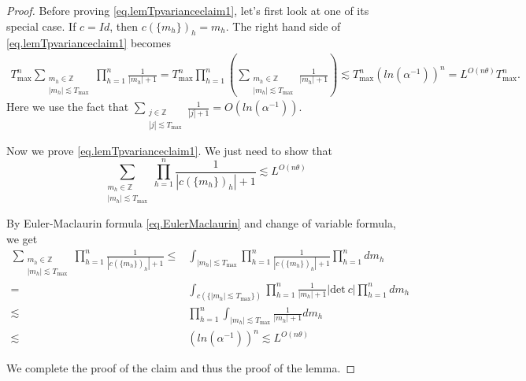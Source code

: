 \begin{proof}
Before proving \eqref{eq.lemTpvarianceclaim1}, let's first look at one of its special case. If $c=Id$, then $c(\{m_{h}\})_{h}=m_h$. The right hand side of \eqref{eq.lemTpvarianceclaim1} becomes
\begin{equation}
\begin{split}
    T^{n}_{\text{max}}\sum_{\substack{m_{h}\in \mathbb{Z}\\ |m_{h}|\lesssim  T_{\text{max}}}} \prod_{h=1}^{n}\frac{1}{|m_{h}|+1} = T^{n}_{\text{max}}\prod_{h=1}^{n}\left(\sum_{\substack{m_{h}\in \mathbb{Z}\\ |m_{h}|\lesssim  T_{\text{max}}}} \frac{1}{|m_{h}|+1}\right)
    \lesssim T^{n}_{\text{max}} (ln(\alpha^{-1}))^{n}= L^{O(n\theta)}T^{n}_{\text{max}}.
\end{split}
\end{equation}
Here we use the fact that $\sum_{\substack{j\in \mathbb{Z}\\ |j|\lesssim  T_{\text{max}}}} \frac{1}{|j|+1}=O(ln(\alpha^{-1}))$.

Now we prove \eqref{eq.lemTpvarianceclaim1}. We just need to show that 
\begin{equation}\label{eq.lemTpvarianceEulerMac}
    \sum_{\substack{m_{h}\in \mathbb{Z}\\ |m_{h}|\lesssim  T_{\text{max}}}} \prod_{h=1}^{n}\frac{1}{|c(\{m_{h}\})_{h}|+1}\lesssim L^{O(n\theta)}
\end{equation}

By Euler-Maclaurin formula \eqref{eq.EulerMaclaurin} and change of variable formula, we get
\begin{equation}
\begin{split}
    \sum_{\substack{m_{h}\in \mathbb{Z}\\ |m_{h}|\lesssim  T_{\text{max}}}} \prod_{h=1}^{n}\frac{1}{|c(\{m_{h}\})_{h}|+1}\le& \int_{|m_{h}|\lesssim  T_{\text{max}}}  \prod_{h=1}^{n}\frac{1}{|c(\{m_{h}\})_{h}|+1}\prod_{h=1}^{n} dm_{h}
    \\
    =& \int_{c(\{|m_{h}|\lesssim  T_{\text{max}}\})}  \prod_{h=1}^{n}\frac{1}{|m_{h}|+1}|\text{det}\ c|\prod_{h=1}^{n}  dm_{h}
    \\
    \lesssim &\prod_{h=1}^{n}\int_{|m_{h}|\lesssim  T_{\text{max}}}  \frac{1}{|m_{h}|+1}  dm_{h}
    \\
    \lesssim & (ln(\alpha^{-1}))^{n}\lesssim L^{O(n\theta)}
\end{split}
\end{equation}

We complete the proof of the claim and thus the proof of the lemma.
\end{proof}

